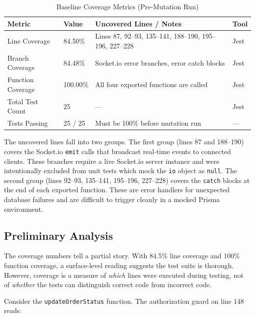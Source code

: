 \documentclass[12pt, a4paper]{article}
\begin{document}
\begin{table}[h!]
\centering
\begin{tabular}{llll}
\toprule
\textbf{Metric}      & \textbf{Value} & \textbf{Uncovered Lines / Notes}                         & \textbf{Tool} \\
\midrule
Line Coverage        & 84.50\%        & Lines 87, 92--93, 135--141, 188--190, 195--196, 227--228 & Jest          \\
Branch Coverage      & 84.48\%        & Socket.io error branches, error catch blocks             & Jest          \\
Function Coverage    & 100.00\%       & All four exported functions are called                   & Jest          \\
Total Test Count     & 25             & ---                                                      & Jest          \\
Tests Passing        & 25 / 25        & Must be 100\% before mutation run                        & ---           \\
\bottomrule
\end{tabular}
\caption{Baseline Coverage Metrics (Pre-Mutation Run)}
\end{table}

The uncovered lines fall into two groups. The first group (lines 87 and 188--190) covers the Socket.io \texttt{emit} calls that broadcast real-time events to connected clients. These branches require a live Socket.io server instance and were intentionally excluded from unit tests which mock the \texttt{io} object as \texttt{null}. The second group (lines 92--93, 135--141, 195--196, 227--228) covers the \texttt{catch} blocks at the end of each exported function. These are error handlers for unexpected database failures and are difficult to trigger cleanly in a mocked Prisma environment.

\subsection{Preliminary Analysis}

The coverage numbers tell a partial story. With 84.5\% line coverage and 100\% function coverage, a surface-level reading suggests the test suite is thorough. However, coverage is a measure of \emph{which} lines were executed during testing, not of \emph{whether} the tests can distinguish correct code from incorrect code.

Consider the \texttt{updateOrderStatus} function. The authorization guard on line 148 reads:
\end{document}
